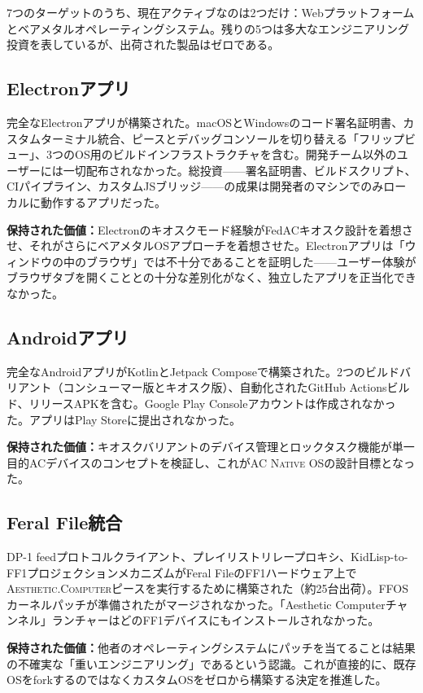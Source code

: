 \documentclass[10pt,letterpaper,twocolumn]{article}
\newcommand{\ac}{\textsc{Aesthetic.Computer}}
\newcommand{\acos}{\textsc{AC Native OS}}
\begin{document}
7つのターゲットのうち、現在アクティブなのは2つだけ：Webプラットフォームとベアメタルオペレーティングシステム。残りの5つは多大なエンジニアリング投資を表しているが、出荷された製品はゼロである。

\subsection{Electronアプリ}

完全なElectronアプリが構築された。macOSとWindowsのコード署名証明書、カスタムターミナル統合、ピースとデバッグコンソールを切り替える「フリップビュー」、3つのOS用のビルドインフラストラクチャを含む。開発チーム以外のユーザーには一切配布されなかった。総投資——署名証明書、ビルドスクリプト、CIパイプライン、カスタムJSブリッジ——の成果は開発者のマシンでのみローカルに動作するアプリだった。

\textbf{保持された価値：}Electronのキオスクモード経験がFedACキオスク設計を着想させ、それがさらにベアメタルOSアプローチを着想させた。Electronアプリは「ウィンドウの中のブラウザ」では不十分であることを証明した——ユーザー体験がブラウザタブを開くこととの十分な差別化がなく、独立したアプリを正当化できなかった。

\subsection{Androidアプリ}

完全なAndroidアプリがKotlinとJetpack Composeで構築された。2つのビルドバリアント（コンシューマー版とキオスク版）、自動化されたGitHub Actionsビルド、リリースAPKを含む。Google Play Consoleアカウントは作成されなかった。アプリはPlay Storeに提出されなかった。

\textbf{保持された価値：}キオスクバリアントのデバイス管理とロックタスク機能が単一目的ACデバイスのコンセプトを検証し、これが\acos{}の設計目標となった。

\subsection{Feral File統合}

DP-1 feedプロトコルクライアント、プレイリストリレープロキシ、KidLisp-to-FF1プロジェクションメカニズムがFeral FileのFF1ハードウェア上で\ac{}ピースを実行するために構築された（約25台出荷）。FFOSカーネルパッチが準備されたがマージされなかった。「Aesthetic Computerチャンネル」ランチャーはどのFF1デバイスにもインストールされなかった。

\textbf{保持された価値：}他者のオペレーティングシステムにパッチを当てることは結果の不確実な「重いエンジニアリング」であるという認識。これが直接的に、既存OSをforkするのではなくカスタムOSをゼロから構築する決定を推進した。
\end{document}
